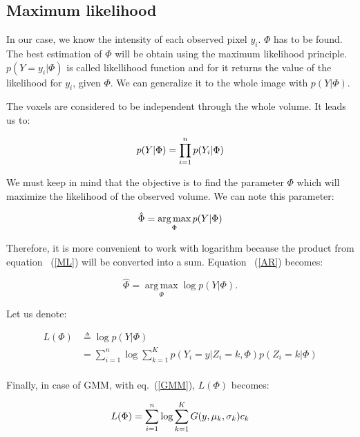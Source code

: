 \subsection{Maximum likelihood}
In our case, we know the intensity of each observed pixel $y_i$. $\Phi$ has to be found. The best estimation of $\Phi$ will be obtain using the maximum likelihood principle. $p(Y=y_i|\Phi)$ is called likellihood function and for it returns the value of the likelihood for $y_i$, given $\Phi$. We can generalize it to the whole image with $p(Y|\Phi)$.
\par
The voxels are considered to be independent through the whole volume. It leads us to:
 
  \begin{equation}\label{ML}
  p(Y|\Phi)= \prod_{i=1}^n p(Y_i|\Phi)\\
  \end{equation}

\par
We must keep in mind that the objective is to find the parameter $\Phi$ which will maximize the likelihood of the observed volume. We can note this parameter:
  
  \begin{equation}\label{AR}
  \hat{\Phi}=\operatorname*{arg\,max}_\Phi p(Y|\Phi)\\
  \end{equation}

\par
Therefore, it is more convenient to work with logarithm because the product from equation ~(\ref{ML}) will be converted into a sum. Equation ~(\ref{AR}) becomes:
  
  \begin{equation*}\label{ARL}
  \hat{\Phi}=\operatorname*{arg\,max}_\Phi \operatorname*{log} p(Y|\Phi). %
  \end{equation*}

Let us denote:

  \begin{align*}
  L(\Phi) &\triangleq \operatorname*{log} p(Y|\Phi) \\
          &= \sum_{i=1}^n \operatorname*{log}\sum_{k=1}^K p(Y_i=y|Z_i=k,\Phi)p(Z_i=k|\Phi)\\
  \end{align*} 

Finally, in case of GMM, with eq.~(\ref{GMM}), $L(\Phi)$ becomes:
  
  \begin{equation*}\label{LP}
  L(\Phi)=\sum_{i=1}^n \operatorname*{log} \sum_{k=1}^K G(y,\mu_k,\sigma_k)c_k\\
  \end{equation*}

